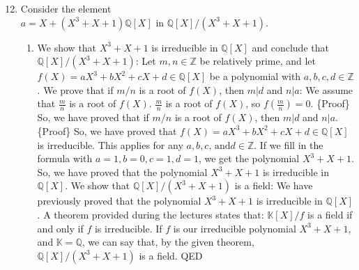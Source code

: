 \documentclass{article}
\begin{document}
\author{Maiko Johannes Nicolaas Bergman, 1259946 \\ Dustin Wilhelmus Maria Bessems, 1228685 \\ Sander Leon Maria Cauberg, 1008909 \\ Guy Jozef Corien Puts, 1232041 \\ Rick Stolk, 1263722}
\title{}
\date{\today}
\newpage
\begin{enumerate}
\setcounter{enumi}{11}
\item Consider the element $a=X+(X^{3}+X+1)\mathbb{Q}[X] \textrm{ in } \mathbb{Q}[X]/(X^{3}+X+1)$.
\begin{enumerate}
\item We show that $X^{3}+X+1$ is irreducible in $\mathbb{Q}[X]$ and conclude that $\mathbb{Q}[X]/(X^{3}+X+1)$:
\newline
Let $m, n \in \mathbb{Z}$ be relatively prime, and let $f(X)=aX^{3}+bX^{2}+cX+d \in \mathbb{Q}[X]$ be a polynomial with $a, b, c, d \in \mathbb{Z}$.
\newline
We prove that if $m/n$ is a root of $f(X)$, then $m|d$ and $n|a$:
\newline
We assume that $\frac{m}{n}$ is a root of $f(X)$.
$\frac{m}{n}$ is a root of $f(X)$, so $f(\frac{m}{n})=0$.
\newline
\{Proof\}
\newline
So, we have proved that if $m/n$ is a root of $f(X)$, then $m|d$ and $n|a$.
\newline
\{Proof\}
\newline
So, we have proved that $f(X)=aX^{3}+bX^{2}+cX+d \in \mathbb{Q}[X]$ is irreducible. This applies for any $a, b, c \textrm{, and} d \in \mathbb{Z}$. If we fill in the formula with $a=1, b=0, c=1, d=1$, we get the polynomial  $X^{3}+X+1$.
\newline
So, we have proved that the polynomial $X^{3}+X+1$ is irreducible in $\mathbb{Q}[X]$.
We show that $\mathbb{Q}[X]/(X^{3}+X+1)$ is a field:
We have previously proved that the polynomial $X^{3}+X+1$ is irreducible in $\mathbb{Q}[X]$.
A theorem provided during the lectures states that: $\mathbb{K}[X]/f$ is a field if and only if $f$ is irreducible. If $f$ is our irreducible polynomial $X^{3}+X+1$, and $\mathbb{K}=\mathbb{Q}$, we can say that, by the given theorem, $\mathbb{Q}[X]/(X^{3}+X+1)$ is a field.
\newline
QED
\end{enumerate}
\end{enumerate}
\end{document}
